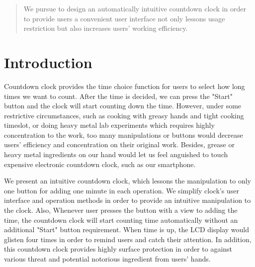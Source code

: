 \documentclass{sig-alternate-ipsn13}
\begin{document}

\maketitle
\begin{abstract}
We pursue to design an automatically intuitive countdown clock in order to provide users a convenient user interface not only lessons usage restriction but also increases users' working efficiency.

\end{abstract}

\section{Introduction}

Countdown clock provides the time choice function for users to select how long times we want to count. After the time is decided, we can press the "Start" button and the clock will start counting down the time. However, under some restrictive circumstances, such as cooking with greasy hands and tight cooking timeslot, or doing heavy metal lab experiments which requires highly concentration to the work, 
too many manipulations or buttons would decrease users' efficiency and concentration on their original work. Besides, grease or heavy metal ingredients on our hand would let us feel anguished to touch expensive electronic countdown clock, such as our smartphone. 

We present an intuitive countdown clock, which lessons the manipulation to only one button for adding one minute in each operation. We simplify clock's user interface and operation methods in order to provide an intuitive manipulation to the clock. Also, Whenever user presses the button with a view to adding the time, the countdown clock will start counting time automatically without an additional "Start" button requirement. When time is up, the LCD display would glisten four times in order to remind users and catch their attention. In addition, this countdown clock provides highly surface protection in order to against various threat and potential notorious ingredient from users' hands. 
\end{document}
